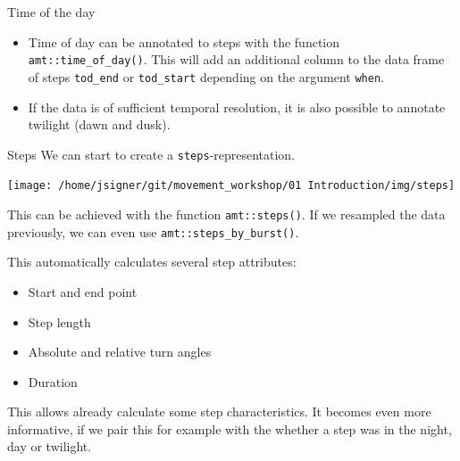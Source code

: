 \documentclass[ignorenonframetext,,t]{beamer}
\providecommand{\tightlist}{%
\setlength{\itemsep}{0pt}\setlength{\parskip}{0pt}}
\providecommand{\tightlist}{%
\setlength{\itemsep}{0pt}\setlength{\parskip}{0pt}}
\renewcommand{\tightlist}{\setlength{\itemsep}{1.4ex}\setlength{\parskip}{0pt}}
\begin{document}
\begin{frame}[fragile]{Time of the day}
\protect\hypertarget{time-of-the-day}{}
\begin{itemize}
\tightlist
\item
  Time of day can be annotated to steps with the function
  \texttt{amt::time\_of\_day()}. This will add an additional column to
  the data frame of steps \texttt{tod\_end} or \texttt{tod\_start}
  depending on the argument \texttt{when}.
\item
  If the data is of sufficient temporal resolution, it is also possible
  to annotate twilight (dawn and dusk).
\end{itemize}
\end{frame}

\begin{frame}[fragile]{Steps}
\protect\hypertarget{steps}{}
We can start to create a \texttt{steps}-representation.

\begin{center}\texttt{[image: /home/jsigner/git/movement\_workshop/01 Introduction/img/steps]} \end{center}

This can be achieved with the function \texttt{amt::steps()}. If we
resampled the data previously, we can even use
\texttt{amt::steps\_by\_burst()}.
\end{frame}

\begin{frame}
This automatically calculates several step attributes:

\begin{itemize}
\tightlist
\item
  Start and end point
\item
  Step length
\item
  Absolute and relative turn angles
\item
  Duration
\end{itemize}

This allows already calculate some step characteristics. It becomes even
more informative, if we pair this for example with the whether a step
was in the night, day or twilight.
\end{frame}

\end{document}

